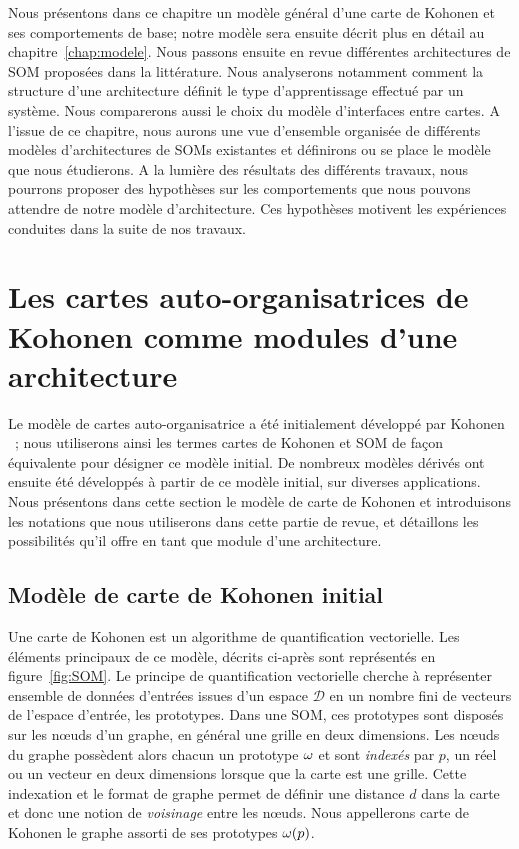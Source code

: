 \documentclass[../main]{subfiles}
\begin{document}
Nous présentons dans ce chapitre un modèle général d'une carte de Kohonen et ses comportements de base; notre modèle sera ensuite décrit plus en détail au chapitre~\ref{chap:modele}.
Nous passons ensuite en revue différentes architectures de SOM proposées dans la littérature. 
Nous analyserons notamment comment la structure d'une architecture définit le type d'apprentissage effectué par un système. Nous comparerons aussi le choix du modèle d'interfaces entre cartes.
A l'issue de ce chapitre, nous aurons une vue d'ensemble organisée de différents modèles d'architectures de SOMs existantes et définirons ou se place le modèle que nous étudierons.
A la lumière des résultats des différents travaux, nous pourrons proposer des hypothèses sur les comportements que nous pouvons attendre de notre modèle d'architecture. 
Ces hypothèses motivent les expériences conduites dans la suite de nos travaux. 

\section{Les cartes auto-organisatrices de Kohonen comme modules d'une architecture}\label{sec:som001}

Le modèle de cartes auto-organisatrice a été initialement développé par Kohonen \cite{Kohonen1982}~; nous utiliserons ainsi les termes cartes de Kohonen et SOM de façon équivalente pour désigner ce modèle initial.
De nombreux modèles dérivés ont ensuite été développés à partir de ce modèle initial, sur diverses applications.
Nous présentons dans cette section le modèle de carte de Kohonen et introduisons les notations que nous utiliserons dans cette partie de revue, et détaillons les possibilités qu'il offre en tant que module d'une architecture. 

\subsection{Modèle de carte de Kohonen initial}

Une carte de Kohonen est un algorithme de quantification vectorielle. Les éléments principaux de ce modèle, décrits ci-après sont représentés en figure~\ref{fig:SOM}.
Le principe de quantification vectorielle cherche à représenter ensemble de données d'entrées issues d'un espace $\mathcal{D}$ en un nombre fini de vecteurs de l'espace d'entrée, les prototypes. 
Dans une SOM, ces prototypes sont disposés sur les n\oe{}uds d'un graphe, en général une grille en deux dimensions.
Les n\oe{}uds du graphe possèdent alors chacun un prototype $\omega$ et sont \emph{indexés} par $p$, un réel ou un vecteur en deux dimensions lorsque que la carte est une grille.
Cette indexation et le format de graphe permet de définir une distance $d$ dans la carte et donc une notion de \emph{voisinage} entre les n\oe{}uds. Nous appellerons carte de Kohonen le graphe assorti de ses prototypes $\omega(p)$.
\end{document}
